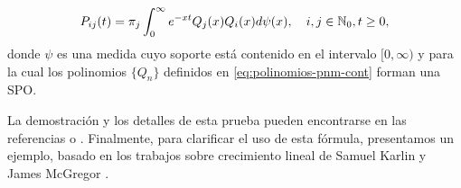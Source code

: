     \begin{equation}
        \label{eq:formula-representacion-cont}
        P_{ij}(t)=\pi_j \int_{0}^\infty e^{-xt} Q_j(x)Q_i(x)d\psi(x), \ \ \ i,j\in\N_0, t\geq 0,
    \end{equation}
    donde $\psi$ es una medida cuyo soporte está contenido en el intervalo $[0,\infty)$ y para la cual los polinomios $\{Q_n\}$ definidos en \eqref{eq:polinomios-pnm-cont} forman una SPO.
    
    La demostración y los detalles de esta prueba pueden encontrarse en las referencias \cite{differential-equations} o \cite[Section 3.2]{Manuel}. Finalmente, para clarificar el uso de esta fórmula, presentamos un ejemplo, basado en los trabajos sobre crecimiento lineal de Samuel Karlin y James McGregor \cite{Linear-Growth}.
    
